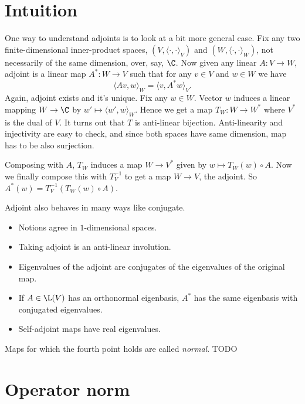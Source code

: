 \section{Intuition}

One way to understand adjoints is to look at a bit more general case. Fix any two finite-dimensional inner-product spaces, $(V, \langle \cdot, \cdot \rangle_{V})$ and $(W, \langle \cdot, \cdot \rangle_{W})$, not necessarily of the same dimension, over, say, $\C$.
Now given any linear $A : V \to W$, adjoint is a linear map $A^{*} : W \to V$ such that for any $v \in V$ and $w \in W$ we have
\[
	\langle A v, w \rangle_{W} = \langle v, A^{*} w \rangle_{V}.
\]
Again, adjoint exists and it's unique. Fix any $w \in W$. Vector $w$ induces a linear mapping $W \to \C$ by $w' \mapsto \langle w', w \rangle_{W}$. Hence we get a map $T_{W} : W \to W^{*}$ where $V^{*}$ is the dual of $V$. It turns out that $T$ is anti-linear bijection. Anti-linearity and injectivity are easy to check, and since both spaces have same dimension, map has to be also surjection.

Composing with $A$, $T_{W}$ induces a map $W \to V^{*}$ given by $w \mapsto T_{W}(w) \circ A$. Now we finally compose this with $T^{-1}_{V}$ to get a map $W \to V$, the adjoint. So $A^{*}(w) = T^{-1}_{V}(T_{W}(w) \circ A)$.

Adjoint also behaves in many ways like conjugate.
\begin{itemize}
	\item Notions agree in $1$-dimensional spaces.
	\item Taking adjoint is an anti-linear involution.
	\item Eigenvalues of the adjoint are conjugates of the eigenvalues of the original map.
	\item If $A \in \L(V)$ has an orthonormal eigenbasis, $A^{*}$ has the same eigenbasis with conjugated eigenvalues.
	\item Self-adjoint maps have real eigenvalues.
\end{itemize}

Maps for which the fourth point holds are called \textit{normal}. TODO

\section{Operator norm}

